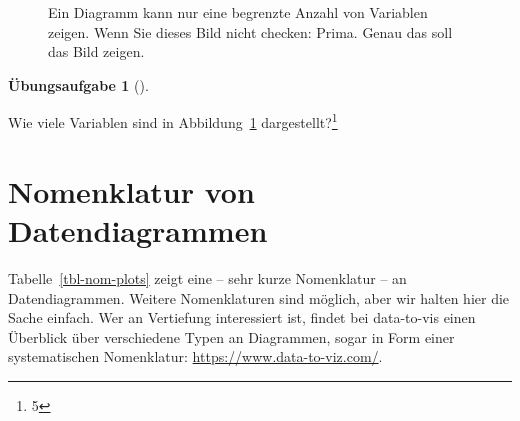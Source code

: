 \documentclass[
  letterpaper,
  oneside,
  open=any]{scrbook}
\theoremstyle{definition}
\newtheorem{exercise}{Übungsaufgabe}[chapter]
\theoremstyle{definition}
\theoremstyle{definition}
\theoremstyle{remark}
\begin{document}
\begin{figure}


\caption{\label{fig-many-dims}Ein Diagramm kann nur eine begrenzte
Anzahl von Variablen zeigen. Wenn Sie dieses Bild nicht checken: Prima.
Genau das soll das Bild zeigen.}

\end{figure}%

\begin{exercise}[]\protect\hypertarget{exr-anz-dims}{}\label{exr-anz-dims}

Wie viele Variablen sind in Abbildung~\ref{fig-many-dims}
dargestellt?\footnote{5}

\end{exercise}

\section{Nomenklatur von
Datendiagrammen}\label{nomenklatur-von-datendiagrammen}

Tabelle~\ref{tbl-nom-plots} zeigt eine -- sehr kurze Nomenklatur -- an
Datendiagrammen. Weitere Nomenklaturen sind möglich, aber wir halten
hier die Sache einfach. Wer an Vertiefung interessiert ist, findet bei
data-to-vis einen Überblick über verschiedene Typen an Diagrammen, sogar
in Form einer systematischen Nomenklatur:
\url{https://www.data-to-viz.com/}.
\end{document}
